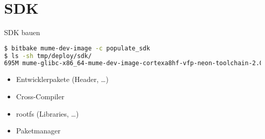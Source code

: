 \section{SDK}

\begin{frame}[fragile]{SDK bauen}
	\pause
	\begin{lstlisting}[frame=single,language=bash, breaklines=true, basicstyle=\small\ttfamily]
$ bitbake mume-dev-image -c populate_sdk
$ ls -sh tmp/deploy/sdk/
695M mume-glibc-x86_64-mume-dev-image-cortexa8hf-vfp-neon-toolchain-2.0.sh
	\end{lstlisting}
	\pause
	\begin{itemize}
		\item Entwicklerpakete (Header, \ldots)
		\item Cross-Compiler
		\item rootfs (Libraries, \ldots)
		\item Paketmanager
	\end{itemize}
\end{frame}
